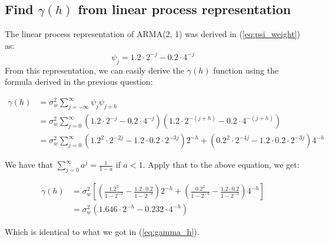 \subsection{Find $\gamma(h)$ from linear process representation}
The linear process representation of ARMA(2, 1) was derived in (\ref{eq:psi_weight}) as:
\begin{equation}
\psi_j = 1.2 \cdot 2^{-j} - 0.2 \cdot 4^{-j}
\end{equation}
From this representation, we can easily derive the $\gamma(h)$ function using the formula derived in the previous question:

\begin{equation}
\begin{split}
\gamma(h) &= \sigma_w^2  \sum_{j = -\infty}^{\infty} \psi_j \psi_{j+h} \\
&= \sigma_w^2  \sum_{j = 0}^{\infty} (1.2 \cdot 2^{-j} - 0.2 \cdot 4^{-j})(1.2 \cdot 2^{-(j+h)} - 0.2 \cdot 4^{-(j+h)})\\
&= \sigma_w^2  \sum_{j = 0}^{\infty}(1.2^2 \cdot 2^{-2j} - 1.2\cdot 0.2 \cdot 2^{-3j})2^{-h} + (0.2^2 \cdot 2^{-4j} - 1.2 \cdot 0.2 \cdot 2^{-3j})4^{-h}
\end{split}
\end{equation}

We have that $\sum_{j=0}^{\infty} a^j = \frac{1}{1-a}$ if $a < 1$. Apply that to the above equation, we get:

\begin{equation}
\begin{split}
\gamma(h) &= \sigma_w^2 [(\frac{1.2^2}{1-2^{-2}} - \frac{1.2\cdot 0.2}{1-2^{-3}})2^{-h} + (\frac{0.2^2}{1-2^{-4}}-\frac{1.2\cdot 0.2}{1-2^{-3}})4^{-h}]\\
 &= \sigma_w^2(1.646 \cdot 2^{-h} - 0.232 \cdot 4^{-h})
\end{split}
\end{equation}

Which is identical to what we got in (\ref{eq:gamma_h}).